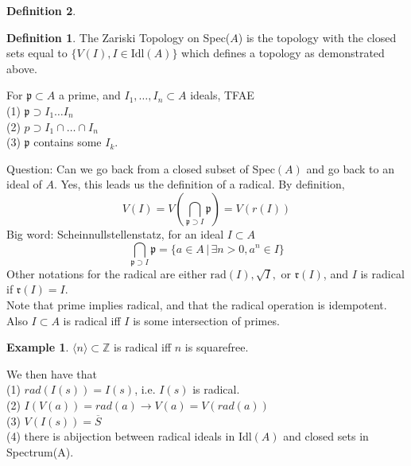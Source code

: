 \documentclass{article}
\theoremstyle{definition}
\newtheorem{example}{Example}[section]
\theoremstyle{definition}
\newtheorem{definition}{Definition}[section]
\theoremstyle{remark}
\newcommand{\Z}{\mathbb{Z}}
\newcommand{\mk}[1]{\mathfrak{#1}}
\newcommand{\ic}{\cap}
\begin{document}
\begin{definition}
\begin{definition}
	The Zariski Topology on Spec($A$) is the topology with the closed sets equal to $\{V(I), I \in \text{Idl}(A)\}$ which defines a topology as demonstrated above.
\end{definition}

\begin{lemm}{}{}
	For $\mk{p} \subset A$ a prime, and $I_1, \dots, I_n \subset A$ ideals, TFAE\\
	\indent (1) $\mk{p} \supset I_1\dots I_n$\\
	\indent (2) $p \supset I_1 \ic \dots \ic I_n$\\
	\indent (3) $\mk{p}$ contains some $I_k$.
\end{lemm}

Question: Can we go back from a closed subset of Spec$(A)$ and go back to an ideal of $A$.
Yes, this leads us the definition of a radical.
By definition, 
\[V(I) = V(\bigcap_{\mk{p} \supset I}\mk{p}) = V(r(I))\]
Big word: Scheinnullstellenstatz, for an ideal $I \subset A$
\[\bigcap_{\mk{p} \supset I}\mk{p} = \{a \in A \, | \, \exists n > 0, a^n \in I\}\]
Other notations for the radical are either $\text{rad}(I), \sqrt{I},$ or $\mk{r}(I)$, and $I$ is radical if $\mk{r}(I)  = I$.\\

Note that prime implies radical, and that the radical operation is idempotent.
Also $I \subset A$ is radical iff $I$ is some intersection of primes.

\begin{example}
	$\langle n \rangle \subset \Z$ is radical iff $n$ is squarefree.
\end{example}

We then have that \\
\indent (1) $rad(I(s)) = I(s)$, i.e. $I(s)$ is radical.\\
\indent (2) $I(V(a)) = rad(a) \rightarrow V(a) = V(rad(a))$\\
\indent (3) $V(I(s)) = \overline{S}$\\
\indent (4) there is abijection between radical ideals in Idl$(A)$ and closed sets in Spectrum(A).






























	
	
	
	
\end{definition}
\end{document}
